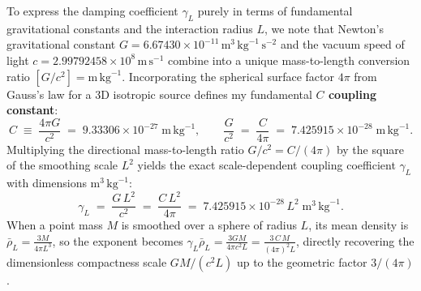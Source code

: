 \documentclass[10pt,a4paper]{article}
\begin{document}
\par
To express the damping coefficient $\gamma_L$ purely in terms of fundamental gravitational constants and the interaction radius $L$, we note that Newton's gravitational constant $G = 6.67430\times 10^{-11}\,\text{m}^3\,\text{kg}^{-1}\,\text{s}^{-2}$ and the vacuum speed of light $c = 2.99792458\times 10^{8}\,\text{m}\,\text{s}^{-1}$ combine into a unique mass-to-length conversion ratio $[G/c^2] = \text{m}\,\text{kg}^{-1}$. Incorporating the spherical surface factor $4\pi$ from Gauss's law for a 3D isotropic source defines my fundamental \textbf{$C$ coupling constant}:
\begin{equation}
  C \;\equiv\; \frac{4\pi G}{c^2} \;=\; 9.33306\times 10^{-27}\;\text{m}\,\text{kg}^{-1}, \qquad
  \frac{G}{c^2} \;=\; \frac{C}{4\pi} \;=\; 7.425915\times 10^{-28}\;\text{m}\,\text{kg}^{-1}.
\end{equation}
Multiplying the directional mass-to-length ratio $G/c^2 = C/(4\pi)$ by the square of the smoothing scale $L^2$ yields the exact scale-dependent coupling coefficient $\gamma_L$ with dimensions $\text{m}^3\,\text{kg}^{-1}$:
\begin{equation}
  \gamma_L \;=\; \frac{G\,L^2}{c^2} \;=\; \frac{C\,L^2}{4\pi} \;=\; 7.425915\times 10^{-28}\,L^2\;\text{m}^3\,\text{kg}^{-1}.
\end{equation}
When a point mass $M$ is smoothed over a sphere of radius $L$, its mean density is $\bar{\rho}_L = \frac{3M}{4\pi L^3}$, so the exponent becomes $\gamma_L \bar{\rho}_L = \frac{3GM}{4\pi c^2 L} = \frac{3\,C\,M}{(4\pi)^2 L}$, directly recovering the dimensionless compactness scale $GM/(c^2 L)$ up to the geometric factor $3/(4\pi)$.
\end{document}
